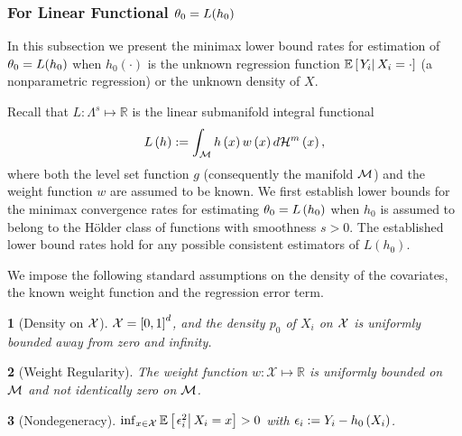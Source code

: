 \documentclass[12pt,american]{article}
\theoremstyle{definition}
\theoremstyle{plain}
\newtheorem{assumption}{\protect\assumptionname}
\theoremstyle{definition}
\theoremstyle{plain}
\theoremstyle{plain}
\theoremstyle{plain}
\theoremstyle{plain}
\theoremstyle{plain}
\newcommand{\R}{\mathbb{R}}
\newcommand{\E}{\mathbb{E}}
\newcommand{\Hm}{\mathcal{H}^{m}}
\providecommand{\assumptionname}{Assumption}
\providecommand{\assumptionname}{Assumption}
\begin{document}
\subsubsection{\label{subsubsec:Minimax_Lin-LB}For Linear Functional $\theta_0=L(h_0)$}

In this subsection we present the minimax lower bound rates for estimation of $\theta_0=L(h_0)$ when $h_{0} (\cdot)$ is the unknown regression function $\E\left[\rest{Y_{i}}X_{i}=\cdot\right]$ (a nonparametric regression) or the unknown density of $X$.

Recall that $L:\Lambda^s \mapsto \R$ is the linear submanifold integral functional
\begin{equation}
  L\left(h\right):=\int_{{\cal M}}h\left(x\right)w\left(x\right)d{\cal H}^{m}\left(x\right),\label{eq:CoreFunc}
\end{equation}
where both the level set function
$g$ (consequently the manifold ${\cal M}$) and the weight function $w$ are assumed to be known.
We first establish lower bounds for the minimax convergence rates for estimating $\theta_{0}=L\left(h_{0}\right)$
when $h_{0}$ is assumed to belong to the H\"{o}lder class of functions with smoothness $s>0$.
The established lower bound rates hold for any possible consistent estimators of $L(h_0)$.
%
%
%

We impose the following standard assumptions on the density of the covariates, the known weight function and the regression error term.

\begin{assumption}[Density on ${\cal X}$]
  \label{assu:density_x} ${\cal X}=\left[0,1\right]^{d}$, and the
  density $p_0$ of $X_{i}$ on ${\cal X}$ is uniformly bounded away from
  zero and infinity.
\end{assumption}
\begin{assumption}[Weight Regularity]
  \label{assu:w}
  The weight function $w:\mathcal{X} \mapsto \R$ is uniformly bounded on $\mathcal{M}$ and not identically zero on $\mathcal{M}$.
\end{assumption}
\begin{assumption}[Nondegeneracy]
  \label{assu:e2_below} $\inf_{x\in{\cal X}}\E\left[\rest{\e_{i}^{2}}X_{i}=x\right]>0$
  with $\epsilon_{i}:=Y_{i}-h_{0}\left(X_{i}\right)$.
\end{assumption}
\end{document}
